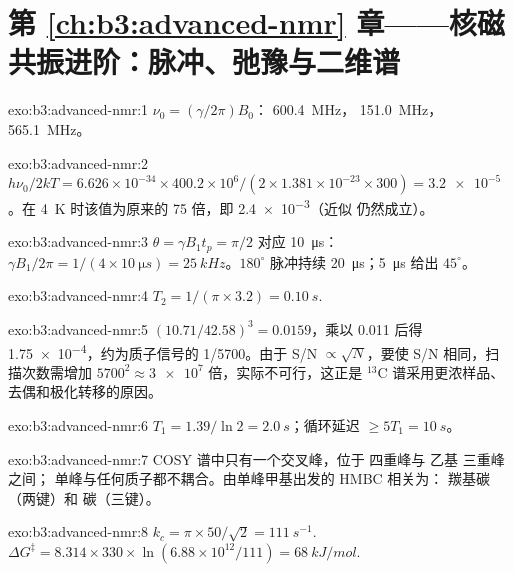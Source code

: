 \section*{第 \ref{ch:b3:advanced-nmr} 章——核磁共振进阶：脉冲、弛豫与二维谱}

\begin{solution}{exo:b3:advanced-nmr:1}
$\nu_0 = (\gamma/2\pi)B_0$： \qty{600.4}{MHz}， \qty{151.0}{MHz}，
\qty{565.1}{MHz}。
\end{solution}

\begin{solution}{exo:b3:advanced-nmr:2}
$h\nu_0/2kT = 6.626\times10^{-34} \times 400.2\times10^6/(2 \times 1.381\times10^{-23} \times 300)
= \num{3.2e-5}$。在 \qty{4}{K} 时该值为原来的 75 倍，即 \num{2.4e-3}（近似
仍然成立）。
\end{solution}

\begin{solution}{exo:b3:advanced-nmr:3}
$\theta = \gamma B_1t_p = \pi/2$ 对应 \qty{10}{\micro s}：$\gamma B_1/2\pi = 1/(4 \times
\qty{10}{\micro s}) = \qty{25}{kHz}$。$180^\circ$ 脉冲持续 \qty{20}{\micro s}；\qty{5}{\micro s}
给出 $45^\circ$。
\end{solution}

\begin{solution}{exo:b3:advanced-nmr:4}
$T_2 = 1/(\pi \times 3.2) = \qty{0.10}{s}$.
\end{solution}

\begin{solution}{exo:b3:advanced-nmr:5}
$(10.71/42.58)^3 = 0.0159$，乘以 0.011 后得 \num{1.75e-4}，约为质子信号的
1/5700。由于 S/N $\propto\sqrt N$，要使 S/N 相同，扫描次数需增加
$5700^2 \approx \num{3e7}$ 倍，实际不可行，这正是 ${}^{13}$C 谱采用更浓样品、
去偶和极化转移的原因。
\end{solution}

\begin{solution}{exo:b3:advanced-nmr:6}
$T_1 = 1.39/\ln2 = \qty{2.0}{s}$；循环延迟 $\ge 5T_1 = \qty{10}{s}$。
\end{solution}

\begin{solution}{exo:b3:advanced-nmr:7}
COSY 谱中只有一个交叉峰，位于  四重峰与
乙基  三重峰之间； 单峰与任何质子都不耦合。由单峰甲基出发的 HMBC 相关为：
羰基碳（两键）和  碳（三键）。
\end{solution}

\begin{solution}{exo:b3:advanced-nmr:8}
$k_c = \pi \times 50/\sqrt2 = \qty{111}{s^{-1}}$. $\Delta G^\ddagger = 8.314 \times 330 \times
\ln(6.88\times10^{12}/111) = \qty{68}{kJ/mol}$.
\end{solution}

